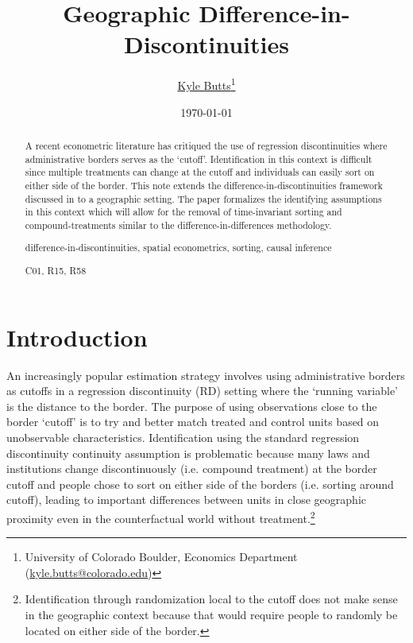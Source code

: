 \documentclass[12pt]{article}
\title{\color{navyblue} Geographic Difference-in-Discontinuities}
\author{\href{https://kylebutts.com/}{Kyle Butts}\thanks{University of Colorado Boulder, Economics Department (\href{mailto:kyle.butts@colorado.edu}{kyle.butts@colorado.edu})}}
\date{\footnotesize\today}
\begin{document}
    \maketitle
    
    \begin{abstract}
        {\small
        A recent econometric literature has critiqued the use of regression discontinuities where administrative borders serves as the `cutoff'. Identification in this context is difficult since multiple treatments can change at the cutoff and individuals can easily sort on either side of the border. This note extends the difference-in-discontinuities framework discussed in \citet{Grembi_Nannicini_Troiano_2016} to a geographic setting. The paper formalizes the identifying assumptions in this context which will allow for the removal of time-invariant sorting and compound-treatments similar to the difference-in-differences methodology.
    
        \par
         difference-in-discontinuities, spatial econometrics, sorting, causal inference
        \par
         C01, R15, R58
        \par
        }
    \end{abstract}

\section{Introduction}

An increasingly popular estimation strategy involves using administrative borders as cutoffs in a regression discontinuity (RD) setting where the `running variable' is the distance to the border. The purpose of using observations close to the border `cutoff' is to try and better match treated and control units based on unobservable characteristics. Identification using the standard regression discontinuity continuity assumption is problematic because many laws and institutions change discontinuously (i.e. compound treatment) at the border cutoff and people chose to sort on either side of the borders (i.e. sorting around cutoff), leading to important differences between units in close geographic proximity even in the counterfactual world without treatment.\footnote{Identification through randomization local to the cutoff does not make sense in the geographic context because that would require people to randomly be located on either side of the border.} 
\end{document}
